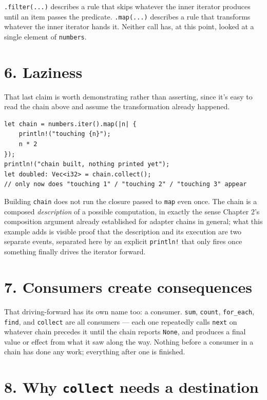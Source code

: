 \documentclass[11pt]{book}
\begin{document}
\texttt{.filter(...)} describes a rule that skips whatever the inner iterator produces until an item passes the predicate. \texttt{.map(...)} describes a rule that transforms whatever the inner iterator hands it. Neither call has, at this point, looked at a single element of \texttt{numbers}.

\section*{6. Laziness}

That last claim is worth demonstrating rather than asserting, since it's easy to read the chain above and assume the transformation already happened.

\begin{lstlisting}
let chain = numbers.iter().map(|n| {
    println!("touching {n}");
    n * 2
});
println!("chain built, nothing printed yet");
let doubled: Vec<i32> = chain.collect();
// only now does "touching 1" / "touching 2" / "touching 3" appear
\end{lstlisting}

Building \texttt{chain} does not run the closure passed to \texttt{map} even once. The chain is a composed \emph{description} of a possible computation, in exactly the sense Chapter 2's composition argument already established for adapter chains in general; what this example adds is visible proof that the description and its execution are two separate events, separated here by an explicit \texttt{println!} that only fires once something finally drives the iterator forward.

\section*{7. Consumers create consequences}

That driving-forward has its own name too: a consumer. \texttt{sum}, \texttt{count}, \texttt{for\_each}, \texttt{find}, and \texttt{collect} are all consumers — each one repeatedly calls \texttt{next} on whatever chain precedes it until the chain reports \texttt{None}, and produces a final value or effect from what it saw along the way. Nothing before a consumer in a chain has done any work; everything after one is finished.

\section*{8. Why \texttt{collect} needs a destination}
\end{document}
